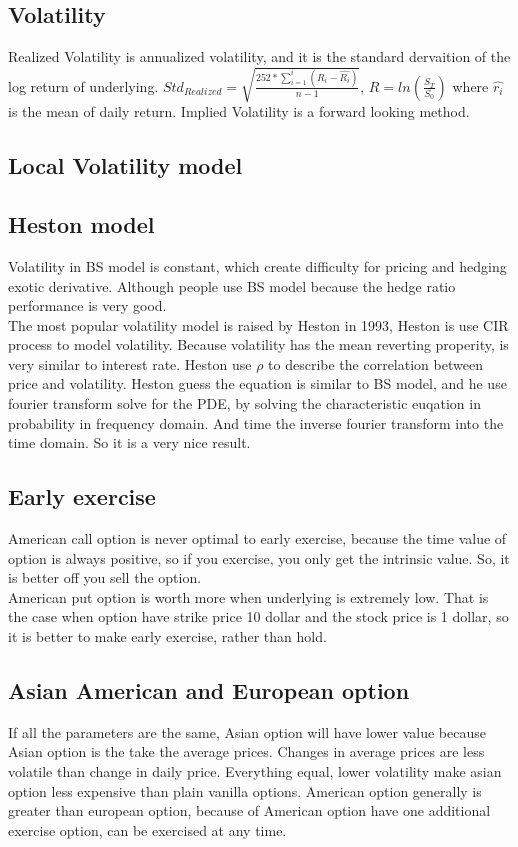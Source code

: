 \documentclass[a4paper,11pt]{article}
\begin{document}
\subsection{Volatility}
Realized Volatility is annualized volatility, and it is the standard dervaition of the log return of underlying. $Std_{Realized}=\sqrt{\frac{252*\sum_{i=1}^{i} (R_i-\hat{R_i})}{n-1}}$, $R=ln(\frac{S_T}{S_0})$ where $\hat{r_i}$ is the mean of daily return.
Implied Volatility is a forward looking method.
\subsection{Local Volatility model}
\subsection{Heston model}
Volatility in BS model is constant, which create difficulty for pricing and hedging exotic derivative. Although people use BS model because the hedge ratio performance is very good.\\
The most popular volatility model is raised by Heston in 1993,  Heston is use CIR process to model volatility. Because volatility has the mean reverting properity, is very similar to interest rate. Heston use $\rho$ to describe the correlation between price and volatility. Heston guess the equation is similar to BS model, and he use fourier transform solve for the PDE, by solving the characteristic euqation in probability in frequency domain. And time the inverse fourier transform into the time domain. So it is a very nice result.\\
\subsection{Early exercise}
American call option is never optimal to early exercise, because the time value of option is always positive, so if you exercise, you only get the intrinsic value. So, it is better off you sell the option.\\
American put option is worth more when underlying is extremely low. That is the case when option have strike price 10 dollar and the stock price is 1 dollar, so it is better to make early exercise, rather than hold.
\subsection{Asian American and European option}
If all the parameters are the same, Asian option will have lower value because Asian option is the take the average prices. Changes in average prices are less volatile than change in daily price. Everything equal, lower volatility make asian option less expensive than plain vanilla options. American option generally is greater than european option, because of American option have one additional exercise option, can be exercised at any time.
\end{document}
